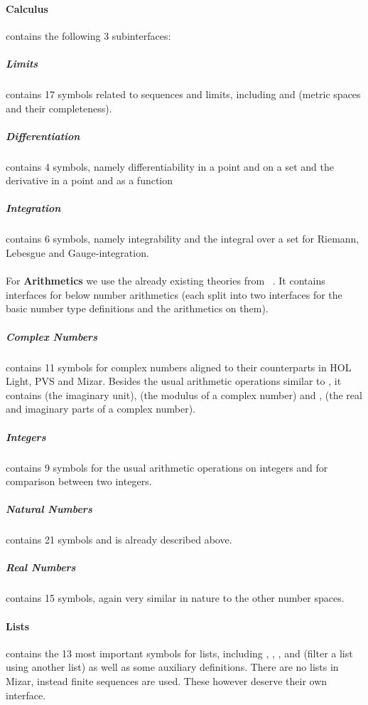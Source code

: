   \paragraph{Calculus} contains the following 3 subinterfaces:
  	\subparagraph{Limits} contains 17 symbols related to sequences and limits, including  and  (metric spaces and their completeness). %
  	\subparagraph{Differentiation} contains 4 symbols, namely differentiability in a point and on a set and the derivative in a point and as a function
  	\subparagraph{Integration} contains 6 symbols, namely integrability and the integral over a set for Riemann, Lebesgue and Gauge-integration.
  \paragraph{} For \textbf{Arithmetics} we use the already existing theories from ~\cite{mitm:smglom:on}. It contains interfaces for below number arithmetics (each split into two interfaces for the basic number type definitions and the arithmetics on them). 
    \subparagraph{Complex Numbers} contains 11 symbols for complex numbers aligned to their counterparts in HOL Light, PVS and Mizar. Besides the usual arithmetic operations similar to , it contains  (the imaginary unit),  (the modulus of a complex number) and ,   (the real and imaginary parts of a complex number). %
    \subparagraph{Integers} contains 9 symbols for the usual arithmetic operations on integers and for comparison between two integers. %
    \subparagraph{Natural Numbers} contains 21 symbols and is already described above. 
    \subparagraph{Real Numbers} contains 15 symbols, again very similar in nature to the other number spaces. %
  \paragraph{Lists} contains the 13 most important symbols for lists, including , , ,  and  (filter a list using another list) as well as some auxiliary definitions. %
  There are no lists in Mizar, instead finite sequences are used. These however deserve their own interface.
